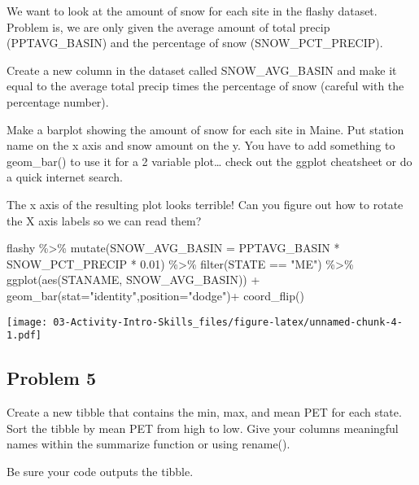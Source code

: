 \documentclass[
]{article}
\newenvironment{Shaded}{\begin{snugshade}}{\end{snugshade}}
\newcommand{\AttributeTok}[1]{\textcolor[rgb]{0.77,0.63,0.00}{#1}}
\newcommand{\FloatTok}[1]{\textcolor[rgb]{0.00,0.00,0.81}{#1}}
\newcommand{\FunctionTok}[1]{\textcolor[rgb]{0.00,0.00,0.00}{#1}}
\newcommand{\NormalTok}[1]{#1}
\newcommand{\SpecialCharTok}[1]{\textcolor[rgb]{0.00,0.00,0.00}{#1}}
\newcommand{\StringTok}[1]{\textcolor[rgb]{0.31,0.60,0.02}{#1}}
\begin{document}
We want to look at the amount of snow for each site in the flashy
dataset. Problem is, we are only given the average amount of total
precip (PPTAVG\_BASIN) and the percentage of snow (SNOW\_PCT\_PRECIP).

Create a new column in the dataset called SNOW\_AVG\_BASIN and make it
equal to the average total precip times the percentage of snow (careful
with the percentage number).

Make a barplot showing the amount of snow for each site in Maine. Put
station name on the x axis and snow amount on the y. You have to add
something to geom\_bar() to use it for a 2 variable plot\ldots{} check
out the ggplot cheatsheet or do a quick internet search.

The x axis of the resulting plot looks terrible! Can you figure out how
to rotate the X axis labels so we can read them?

\begin{Shaded}
\begin{Highlighting}[]
\NormalTok{flashy }\SpecialCharTok{\%\textgreater{}\%}
  \FunctionTok{mutate}\NormalTok{(}\AttributeTok{SNOW\_AVG\_BASIN =}\NormalTok{ PPTAVG\_BASIN }\SpecialCharTok{*}\NormalTok{ SNOW\_PCT\_PRECIP }\SpecialCharTok{*} \FloatTok{0.01}\NormalTok{) }\SpecialCharTok{\%\textgreater{}\%}
  \FunctionTok{filter}\NormalTok{(STATE }\SpecialCharTok{==} \StringTok{"ME"}\NormalTok{) }\SpecialCharTok{\%\textgreater{}\%}
  \FunctionTok{ggplot}\NormalTok{(}\FunctionTok{aes}\NormalTok{(STANAME, SNOW\_AVG\_BASIN)) }\SpecialCharTok{+}
  \FunctionTok{geom\_bar}\NormalTok{(}\AttributeTok{stat=}\StringTok{"identity"}\NormalTok{,}\AttributeTok{position=}\StringTok{"dodge"}\NormalTok{)}\SpecialCharTok{+}
  \FunctionTok{coord\_flip}\NormalTok{()}
\end{Highlighting}
\end{Shaded}

\texttt{[image: 03-Activity-Intro-Skills\_files/figure-latex/unnamed-chunk-4-1.pdf]}

\hypertarget{problem-5}{%
\subsection{Problem 5}\label{problem-5}}

Create a new tibble that contains the min, max, and mean PET for each
state. Sort the tibble by mean PET from high to low. Give your columns
meaningful names within the summarize function or using rename().

Be sure your code outputs the tibble.
\end{document}
